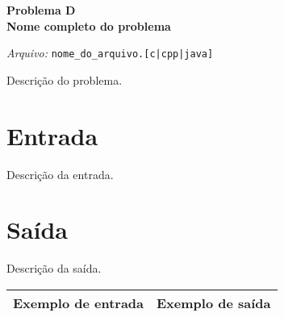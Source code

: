 \newpage

\begin{center}
\LARGE{\textbf{Problema D} \\ \textbf{Nome completo do problema}} 

\vspace{0.5em}
\normalsize

\textit{Arquivo:}
\verb+nome_do_arquivo.[c|cpp|java]+  

\end{center}

Descrição do problema. \\

\section*{Entrada}

Descrição da entrada. \\

\section*{Saída}

Descrição da saída. \\

\begin{center}
  \begin{tabular}{ | l | l | }
    \hline
    \textbf{Exemplo de entrada} & \textbf{Exemplo de saída} \\ 
    \hline
	
	\hline
  \end{tabular}
\end{center}